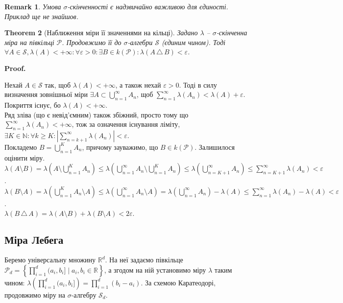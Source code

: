 \documentclass[a4paper, 10pt]{article}
\makeatletter
\theoremstyle{theoremdd}
\newtheorem{theorem}{Theorem}[subsection]
\newtheorem{remark}[theorem]{Remark}
\renewenvironment{proof}[1][Proof.\\]{\par
\pushQED{\hfill \qed}%
\normalfont \topsep6\p@\@plus6\p@\relax
\trivlist
\item\relax
{\bfseries
#1\@addpunct{.}}\hspace\labelsep\ignorespaces
}{%
\popQED\endtrivlist\@endpefalse
}
\newcommand{\symdif}{\,\triangle\,} %
\makeatother
\begin{document}
\begin{remark}
Умова $\sigma$-скінченності є надзвичайно важливою для єдиності. Приклад ще не знайшов.
\end{remark}

\begin{theorem}[Наближення міри її значеннями на кільці]
Задано $\lambda$ -- $\sigma$-скінченна міра на півкільці $\mathcal{P}$. Продовжимо її до $\sigma$-алгебри $\mathcal{S}$ (єдиним чином). Тоді\\
$\forall A \in \mathcal{S}, \lambda(A) < +\infty: \forall \varepsilon > 0: \exists B \in k(\mathcal{P}): \lambda(A \symdif B) < \varepsilon$.
\end{theorem}

\begin{proof}
Нехай $A \in \mathcal{S}$ так, щоб $\lambda(A) < +\infty$, а також нехай $\varepsilon > 0$. Тоді в силу визначення зовнішньої міри $\exists A \subset \displaystyle\bigcup_{n=1}^\infty A_n$, щоб $\displaystyle\sum_{n=1}^\infty \lambda(A_n) < \lambda(A) + \varepsilon$. Покриття існує, бо $\lambda(A) < +\infty$.\\
Ряд зліва (що є невід'ємним) також збіжний, просто тому що $\displaystyle\sum_{n=1}^\infty \lambda(A_n) < +\infty$, тож за означення існування ліміту, $\exists K \in \mathbb{N}: \forall k \geq K: \left|\displaystyle\sum_{n=k+1}^{\infty} \lambda(A_n)\right| < \varepsilon$.\\
Покладемо $B = \displaystyle\bigcup_{n=1}^K A_n$, причому зауважимо, що $B \in k(\mathcal{P})$. Залишилося оцінити міру.\\
$\displaystyle\lambda(A \setminus B) = \lambda\left( A \setminus \bigcup_{n=1}^K A_n \right) \leq \lambda\left( \displaystyle\bigcup_{n=1}^\infty A_n \setminus \bigcup_{n=1}^K A_n \right) \leq \lambda\left( \bigcup_{n = K+1}^\infty A_n \right) \leq \sum_{n=K+1}^\infty \lambda(A_n) < \varepsilon$.\\
$\displaystyle\lambda(B \setminus A) = \lambda\left( \bigcup_{n=1}^K A_n \setminus A \right) \leq \lambda\left( \bigcup_{n=1}^\infty A_n \setminus A \right) = \lambda\left( \bigcup_{n=1}^\infty A_n \right) - \lambda(A) \leq \sum_{n=1}^\infty \lambda(A_n) - \lambda(A) < \varepsilon$.\\
$\lambda(B \symdif A) = \lambda(A \setminus B) + \lambda(B \setminus A) <2 \varepsilon$.
\end{proof}

\subsection{Міра Лебега}
Беремо універсальну множину $\mathbb{R}^d$. На неї задаємо півкільце $\displaystyle \mathcal{P}_d = \left\{ \prod_{i=1}^d (a_i,b_i] \mid a_i,b_i \in \mathbb{R} \right\}$, а згодом на ній установимо міру $\lambda$ таким чином: $\displaystyle\lambda\left( \prod_{i=1}^d (a_i,b_i] \right) = \prod_{i=1}^d (b_i-a_i)$. За схемою Каратеодорі, продовжимо міру на $\sigma$-алгебру $\mathcal{S}_d$.
\end{document}
